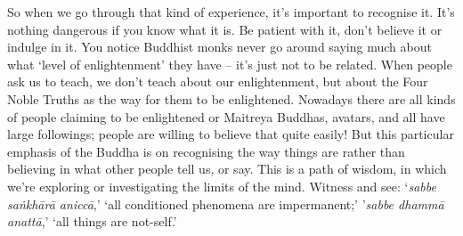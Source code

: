 So when we go through that kind of experience, it's important to recognise it. It's nothing dangerous if you know what it is. Be patient with it, don't believe it or indulge in it. You notice Buddhist monks never go around saying much about what `level of enlightenment' they have -- it's just not to be related. When people ask us to teach, we don't teach about our enlightenment, but about the Four Noble Truths as the way for them to be enlightened. Nowadays there are all kinds of people claiming to be enlightened or Maitreya Buddhas, avatars, and all have large followings; people are willing to believe that quite easily! But this particular emphasis of the Buddha is on recognising the way things are rather than believing in what other people tell us, or say. This is a path of wisdom, in which we're exploring or investigating the limits of the mind. Witness and see: `\textit{sabbe saṅkhārā aniccā},' `all conditioned phenomena are impermanent;' '\textit{sabbe dhammā anattā},' `all things are not-self.'


